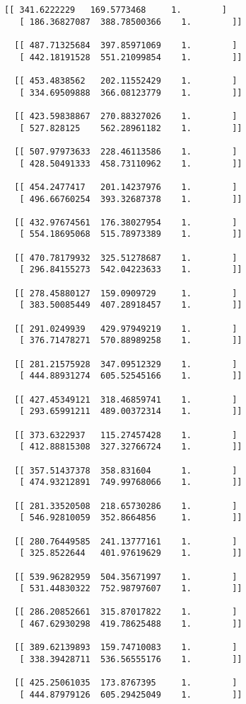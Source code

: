 \documentclass[11pt]{article}
\begin{document}
\begin{Verbatim}[commandchars=\\\{\}]
  [[ 341.6222229   169.5773468     1.        ]
   [ 186.36827087  388.78500366    1.        ]]

  [[ 487.71325684  397.85971069    1.        ]
   [ 442.18191528  551.21099854    1.        ]]

  [[ 453.4838562   202.11552429    1.        ]
   [ 334.69509888  366.08123779    1.        ]]

  [[ 423.59838867  270.88327026    1.        ]
   [ 527.828125    562.28961182    1.        ]]

  [[ 507.97973633  228.46113586    1.        ]
   [ 428.50491333  458.73110962    1.        ]]

  [[ 454.2477417   201.14237976    1.        ]
   [ 496.66760254  393.32687378    1.        ]]

  [[ 432.97674561  176.38027954    1.        ]
   [ 554.18695068  515.78973389    1.        ]]

  [[ 470.78179932  325.51278687    1.        ]
   [ 296.84155273  542.04223633    1.        ]]

  [[ 278.45880127  159.0909729     1.        ]
   [ 383.50085449  407.28918457    1.        ]]

  [[ 291.0249939   429.97949219    1.        ]
   [ 376.71478271  570.88989258    1.        ]]

  [[ 281.21575928  347.09512329    1.        ]
   [ 444.88931274  605.52545166    1.        ]]

  [[ 427.45349121  318.46859741    1.        ]
   [ 293.65991211  489.00372314    1.        ]]

  [[ 373.6322937   115.27457428    1.        ]
   [ 412.88815308  327.32766724    1.        ]]

  [[ 357.51437378  358.831604      1.        ]
   [ 474.93212891  749.99768066    1.        ]]

  [[ 281.33520508  218.65730286    1.        ]
   [ 546.92810059  352.8664856     1.        ]]

  [[ 280.76449585  241.13777161    1.        ]
   [ 325.8522644   401.97619629    1.        ]]

  [[ 539.96282959  504.35671997    1.        ]
   [ 531.44830322  752.98797607    1.        ]]

  [[ 286.20852661  315.87017822    1.        ]
   [ 467.62930298  419.78625488    1.        ]]

  [[ 389.62139893  159.74710083    1.        ]
   [ 338.39428711  536.56555176    1.        ]]

  [[ 425.25061035  173.8767395     1.        ]
   [ 444.87979126  605.29425049    1.        ]]


\end{Verbatim}
\end{document}
